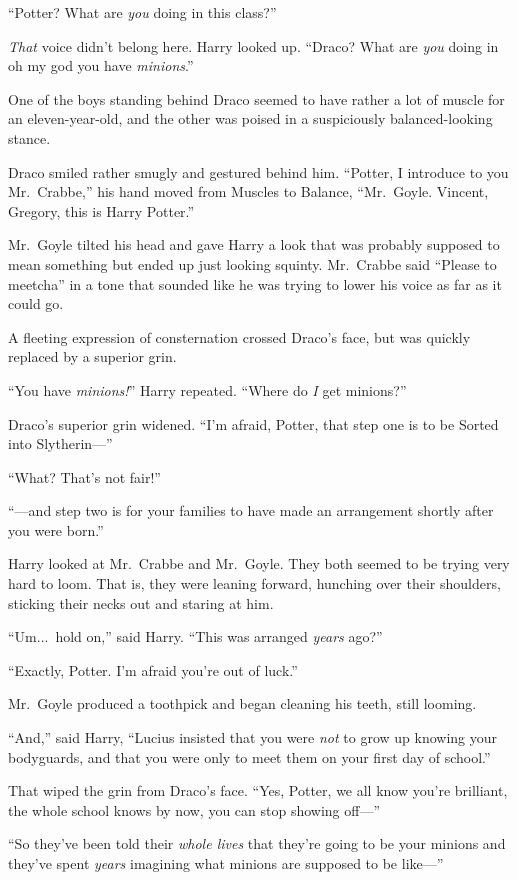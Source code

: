 “Potter? What are \emph{you} doing in this class?”

\emph{That} voice didn’t belong here. Harry looked up. “Draco? What are \emph{you} doing in oh my god you have \emph{minions}.”

One of the boys standing behind Draco seemed to have rather a lot of muscle for an eleven-year-old, and the other was poised in a suspiciously balanced-looking stance.

Draco smiled rather smugly and gestured behind him. “Potter, I introduce to you Mr.~Crabbe,” his hand moved from Muscles to Balance, “Mr.~Goyle. Vincent, Gregory, this is Harry Potter.”

Mr.~Goyle tilted his head and gave Harry a look that was probably supposed to mean something but ended up just looking squinty. Mr.~Crabbe said “Please to meetcha” in a tone that sounded like he was trying to lower his voice as far as it could go.

A fleeting expression of consternation crossed Draco’s face, but was quickly replaced by a superior grin.

“You have \emph{minions!}” Harry repeated. “Where do \emph{I} get minions?”

Draco’s superior grin widened. “I’m afraid, Potter, that step one is to be Sorted into Slytherin—”

“What? That’s not fair!”

“—and step two is for your families to have made an arrangement shortly after you were born.”

Harry looked at Mr.~Crabbe and Mr.~Goyle. They both seemed to be trying very hard to loom. That is, they were leaning forward, hunching over their shoulders, sticking their necks out and staring at him.

“Um...\ hold on,” said Harry. “This was arranged \emph{years} ago?”

“Exactly, Potter. I’m afraid you’re out of luck.”

Mr.~Goyle produced a toothpick and began cleaning his teeth, still looming.

“And,” said Harry, “Lucius insisted that you were \emph{not} to grow up knowing your bodyguards, and that you were only to meet them on your first day of school.”

That wiped the grin from Draco’s face. “Yes, Potter, we all know you’re brilliant, the whole school knows by now, you can stop showing off—”

“So they’ve been told their \emph{whole lives} that they’re going to be your minions and they’ve spent \emph{years} imagining what minions are supposed to be like—”

